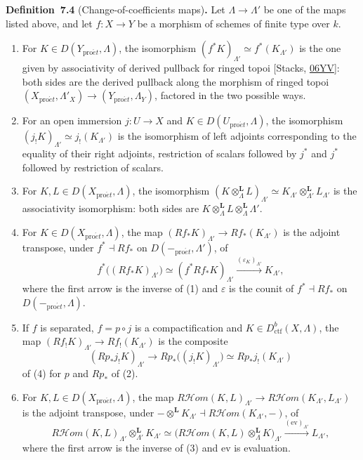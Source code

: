 \documentclass[11pt]{article}
\newenvironment{bpstatement}[2]{\par\addvspace{0.6\baselineskip}\noindent\textbf{#1}#2\textbf{.}\enspace\ignorespaces}
  {\par\addvspace{0.4\baselineskip}}
\providecommand{\cHom}{}\renewcommand{\cHom}{R\mathcal{H}\!om}
\begin{document}
\label{bp12}%
\begin{bpstatement}{Definition~7.4}{ (Change-of-coefficients maps)}
Let \(\Lambda\to\Lambda'\) be one of the maps listed above, and let \(f:X\to Y\) be a morphism of schemes of finite type over \(k\).

\begin{enumerate}
\item For \(K\in D(Y_{\mathrm{pro}\acute{e}t},\Lambda)\), the isomorphism \((f^*K)_{\Lambda'}\simeq f^*(K_{\Lambda'})\) is the one given by associativity of derived pullback for ringed topoi [Stacks, \href{https://stacks.math.columbia.edu/tag/06YV}{06YV}]: both sides are the derived pullback along the morphism of ringed topoi \((X_{\mathrm{pro}\acute{e}t},\Lambda'_X)\to(Y_{\mathrm{pro}\acute{e}t},\Lambda_Y)\), factored in the two possible ways.
\item For an open immersion \(j:U\to X\) and \(K\in D(U_{\mathrm{pro}\acute{e}t},\Lambda)\), the isomorphism \((j_!K)_{\Lambda'}\simeq j_!(K_{\Lambda'})\) is the isomorphism of left adjoints corresponding to the equality of their right adjoints, restriction of scalars followed by \(j^*\) and \(j^*\) followed by restriction of scalars.
\item For \(K,L\in D(X_{\mathrm{pro}\acute{e}t},\Lambda)\), the isomorphism \((K\otimes^{\mathbf L}_\Lambda L)_{\Lambda'}\simeq
  K_{\Lambda'}\otimes^{\mathbf L}_{\Lambda'}L_{\Lambda'}\) is the associativity isomorphism: both sides are \(K\otimes^{\mathbf L}_\Lambda L\otimes^{\mathbf L}_\Lambda\Lambda'\).
\item For \(K\in D(X_{\mathrm{pro}\acute{e}t},\Lambda)\), the map \((Rf_*K)_{\Lambda'}\to Rf_*(K_{\Lambda'})\) is the adjoint transpose, under \(f^*\dashv Rf_*\) on \(D(-_{\mathrm{pro}\acute{e}t},\Lambda')\), of \[
   f^*\bigl((Rf_*K)_{\Lambda'}\bigr)\simeq(f^*Rf_*K)_{\Lambda'}
   \xrightarrow{(\varepsilon_K)_{\Lambda'}}K_{\Lambda'},
   \] where the first arrow is the inverse of (1) and \(\varepsilon\) is the counit of \(f^*\dashv Rf_*\) on \(D(-_{\mathrm{pro}\acute{e}t},\Lambda)\).
\item If \(f\) is separated, \(f=p\circ j\) is a compactification and \(K\in D^b_{\mathrm{ctf}}(X,\Lambda)\), the map \((Rf_!K)_{\Lambda'}\to Rf_!(K_{\Lambda'})\) is the composite \[
   (Rp_*j_!K)_{\Lambda'}\longrightarrow Rp_*\bigl((j_!K)_{\Lambda'}\bigr)
   \simeq Rp_*j_!(K_{\Lambda'})
   \] of (4) for \(p\) and \(Rp_*\) of (2).
\item For \(K,L\in D(X_{\mathrm{pro}\acute{e}t},\Lambda)\), the map \(\cHom(K,L)_{\Lambda'}\to\cHom(K_{\Lambda'},L_{\Lambda'})\) is the adjoint transpose, under \(-\otimes^{\mathbf L}K_{\Lambda'}\dashv
  \cHom(K_{\Lambda'},-)\), of \[
   \cHom(K,L)_{\Lambda'}\otimes^{\mathbf L}_{\Lambda'}K_{\Lambda'}
   \simeq\bigl(\cHom(K,L)\otimes^{\mathbf L}_\Lambda K\bigr)_{\Lambda'}
   \xrightarrow{(\mathrm{ev})_{\Lambda'}}L_{\Lambda'},
   \] where the first arrow is the inverse of (3) and \(\mathrm{ev}\) is evaluation.
\end{enumerate}
\end{bpstatement}
\end{document}

